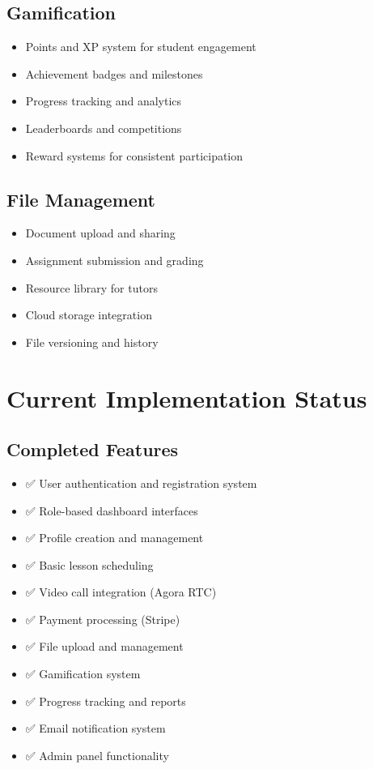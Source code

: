 \documentclass[11pt,a4paper]{article}
\begin{document}
\subsection{Gamification}
\begin{itemize}
    \item Points and XP system for student engagement
    \item Achievement badges and milestones
    \item Progress tracking and analytics
    \item Leaderboards and competitions
    \item Reward systems for consistent participation
\end{itemize}

\subsection{File Management}
\begin{itemize}
    \item Document upload and sharing
    \item Assignment submission and grading
    \item Resource library for tutors
    \item Cloud storage integration
    \item File versioning and history
\end{itemize}

\section{Current Implementation Status}

\subsection{Completed Features}
\begin{itemize}
    \item ✅ User authentication and registration system
    \item ✅ Role-based dashboard interfaces
    \item ✅ Profile creation and management
    \item ✅ Basic lesson scheduling
    \item ✅ Video call integration (Agora RTC)
    \item ✅ Payment processing (Stripe)
    \item ✅ File upload and management
    \item ✅ Gamification system
    \item ✅ Progress tracking and reports
    \item ✅ Email notification system
    \item ✅ Admin panel functionality
\end{itemize}
\end{document}
